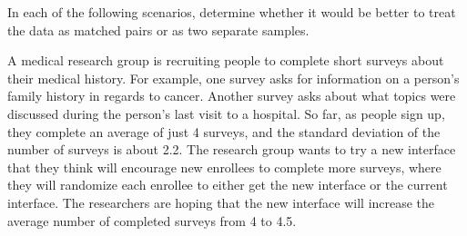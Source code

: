 \documentclass[11pt]{exam}
\begin{document}
\begin{questions}
\question[6] In each of the following scenarios, determine whether it would be better to treat the data as matched pairs or as two separate samples.   

\newpage
\question A medical research group is recruiting people to complete short surveys
about their medical history. For example, one survey asks for information on a person's family history in
regards to cancer. Another survey asks about what topics were discussed during the person's last visit to a
hospital. So far, as people sign up, they complete an average of just 4 surveys, and the standard deviation
of the number of surveys is about 2.2. The research group wants to try a new interface that they think will
encourage new enrollees to complete more surveys, where they will randomize each enrollee to either get the
new interface or the current interface. The researchers are hoping that the new interface will increase the average number of completed surveys from 4 to 4.5.  
\begin{parts}

\end{parts}
\end{questions}
\end{document}
